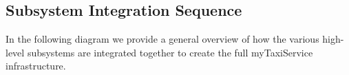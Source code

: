 \subsection{Subsystem Integration Sequence}
In the following diagram we provide a general overview of how the various high-level subsystems are integrated together to create the full myTaxiService infrastructure.
\begin{figure}[H]
\centering
{}
\end{figure}